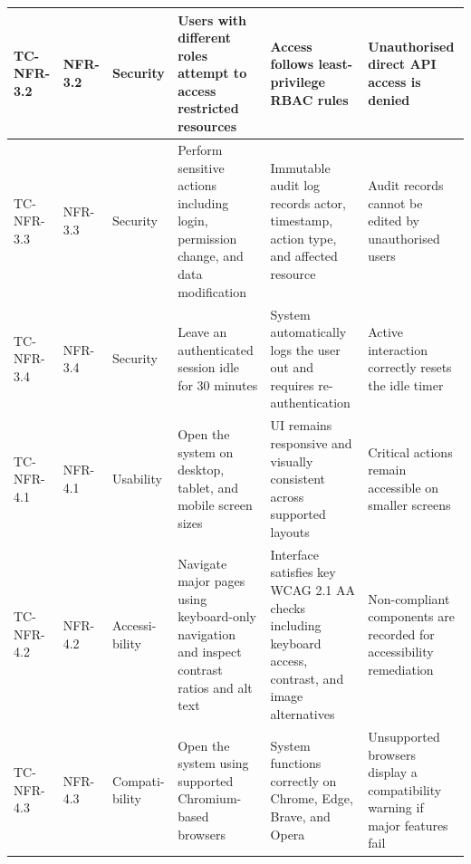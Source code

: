 \begin{longtable}{|>{\centering\arraybackslash}m{}|>{\centering\arraybackslash}m{}|>{\centering\arraybackslash}m{}|m{}|m{}|m{}|}
TC-NFR-3.2 & NFR-3.2 & Security &
Users with different roles attempt to access
restricted resources &
Access follows least-privilege RBAC rules &
Unauthorised direct API access is denied \\ \hline

TC-NFR-3.3 & NFR-3.3 & Security &
Perform sensitive actions including login, permission
change, and data modification &
Immutable audit log records actor, timestamp, action
type, and affected resource &
Audit records cannot be edited by unauthorised users \\ \hline

TC-NFR-3.4 & NFR-3.4 & Security &
Leave an authenticated session idle for 30 minutes &
System automatically logs the user out and requires
re-authentication &
Active interaction correctly resets the idle timer \\ \hline

TC-NFR-4.1 & NFR-4.1 & Usability &
Open the system on desktop, tablet, and mobile
screen sizes &
UI remains responsive and visually consistent
across supported layouts &
Critical actions remain accessible on smaller screens \\ \hline

TC-NFR-4.2 & NFR-4.2 & Accessi-bility &
Navigate major pages using keyboard-only navigation
and inspect contrast ratios and alt text &
Interface satisfies key WCAG 2.1 AA checks including
keyboard access, contrast, and image alternatives &
Non-compliant components are recorded for
accessibility remediation \\ \hline

TC-NFR-4.3 & NFR-4.3 & Compati-bility &
Open the system using supported Chromium-based browsers &
System functions correctly on Chrome, Edge, Brave,
and Opera &
Unsupported browsers display a compatibility warning
if major features fail \\ \hline

\end{longtable}

\endgroup
